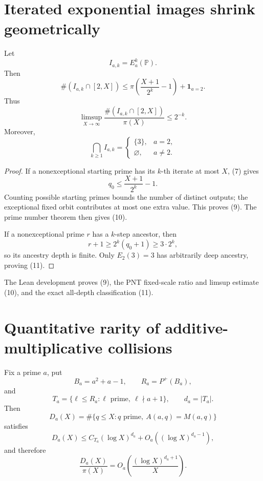 \documentclass[10pt,a4paper]{scrartcl}
\newcommand{\PP}{\mathbb P}
\newcommand{\ind}{\mathbf 1}
\begin{document}
\section{Iterated exponential images shrink geometrically}

Let
\[
I_{a,k}=E_a^k(\PP).
\]
Then
\begin{equation}
\#(I_{a,k}\cap[2,X])
\le\pi\!\left(\frac{X+1}{2^k}-1\right)+\ind_{a=2}. \tag{9}
\end{equation}
Thus
\begin{equation}
\limsup_{X\to\infty}\frac{\#(I_{a,k}\cap[2,X])}{\pi(X)}\le2^{-k}. \tag{10}
\end{equation}
Moreover,
\begin{equation}
\bigcap_{k\ge1}I_{a,k}=
\begin{cases}
\{3\},&a=2,\\
\varnothing,&a\ne2.
\end{cases} \tag{11}
\end{equation}

\begin{proof}
If a nonexceptional starting prime has its $k$-th iterate at most $X$, (7) gives
\[
q_0\le\frac{X+1}{2^k}-1.
\]
Counting possible starting primes bounds the number of distinct outputs; the exceptional fixed orbit contributes at most one extra value. This proves (9). The prime number theorem then gives (10).

If a nonexceptional prime $r$ has a $k$-step ancestor, then
\[
r+1\ge2^k(q_0+1)\ge3\cdot2^k,
\]
so its ancestry depth is finite. Only $E_2(3)=3$ has arbitrarily deep ancestry, proving (11).
\end{proof}

The Lean development proves (9), the PNT fixed-scale ratio and limsup estimate (10), and the exact all-depth classification (11).

\section{Quantitative rarity of additive-multiplicative collisions}

Fix a prime $a$, put
\[
B_a=a^2+a-1,\qquad R_a=P^+(B_a),
\]
and
\[
T_a=\{\ell\le R_a:\ell\text{ prime},\ \ell\nmid a+1\},\qquad d_a=|T_a|.
\]
Then
\[
D_a(X)=\#\{q\le X:q\text{ prime},\ A(a,q)=M(a,q)\}
\]
satisfies
\begin{equation}
D_a(X)\le C_{T_a}(\log X)^{d_a}+O_a((\log X)^{d_a-1}), \tag{12}
\end{equation}
and therefore
\begin{equation}
\frac{D_a(X)}{\pi(X)}=O_a\!\left(\frac{(\log X)^{d_a+1}}{X}\right). \tag{13}
\end{equation}
\end{document}
